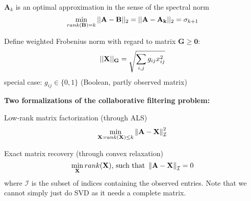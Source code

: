 \documentclass[12pt]{article}
\begin{document}
\par $\mathbf{A}_k$ is an optimal approximation in the sense of the spectral norm
\[ \min_{rank(\mathbf{B})=k} ||\mathbf{A-B}||_2 = ||\mathbf{A - A_k}||_2 = \sigma_{k+1} \]
\par Define weighted Frobenius norm with regard to matrix $\mathbf{G} \geq \mathbf{0}$:
\[ ||\mathbf{X}||_{\mathbf{G}} = \sqrt{\sum_{i,j} g_{ij}x_{ij}^2} \]
special case: $g_{ij} \in \{ 0,1 \}$ (Boolean, partly observed matrix)
\par \textbf{Two formalizations of the collaborative filtering problem:}
\ulb
\item Low-rank matrix factorization (through ALS)
\[ \min_{\mathbf{X}:rank(\mathbf{X})\leq k} \left\lVert\mathbf{A-X}\right\rVert^2_{\mathcal{I}} \]
\item Exact matrix recovery (through convex relaxation)
\[ \min_{\mathbf{X}} rank(\mathbf{X}) \text{, such that } \left\lVert\mathbf{A-X}\right\rVert_{\mathcal{I}} = 0 \]
\ule
where $\mathcal{I}$ is the subset of indices containing the observed entries. Note that we cannot simply just do SVD as it needs a complete matrix.
\end{document}
